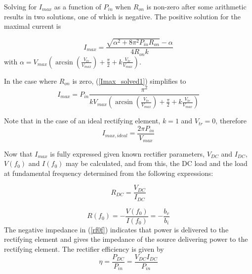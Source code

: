 Solving for $I_{max}$ as a function of $P_{in}$ when $R_{on}$ is non-zero after some arithmetic results in two solutions, one of which is negative. The positive solution for the maximal current is

\begin{equation}\label{Imax_solved1}
    I_{max} = \frac{ \sqrt{\alpha^2 + 8\pi^2P_{in}R_{on}}-\alpha}{4R_{on}k}
\end{equation}
with $\alpha=V_{max}\left(\arcsin\left(\frac{V_{tr}}{V_{max}}\right)+ \frac{\pi}{2} + k\frac{V_{tr}}{V_{max}}\right)$.

In the case where $R_{on}$ is zero, (\ref{Imax_solved1}) simplifies to
\begin{equation}\label{Imax_solve_zeroron_solved}
    I_{max} = P_{in}\frac{\pi^2}{kV_{max}\left(\arcsin\left(\frac{V_{tr}}{V_{max}}\right)+ \frac{\pi}{2} + k\frac{V_{tr}}{V_{max}}\right)}
\end{equation}

Note that in the case of an ideal rectifying element, $k = 1$ and $V_{tr} = 0$, therefore
\begin{equation}\label{Imax_solve_zeroron_solved_ideal}
    I_{max,ideal} = \frac{2\pi P_{in}}{V_{max}}
\end{equation}

Now that $I_{max}$ is fully expressed given known rectifier parameters, $V_{DC}$ and $I_{DC}$, $V(f_0)$ and $I(f_0)$ may be calculated, and from this, the DC load and the load at fundamental frequency determined from the following expressions:

\begin{equation}\label{rdcf}
    R_{DC} = \frac{V_{DC}}{I_{DC}}
\end{equation}

\begin{equation}\label{rf0f}
    R(f_0) = -\frac{V(f_0)}{I(f_0)} = -\frac{b_v}{b_i}
\end{equation}
The negative impedance in (\ref{rf0f}) indicates that power is delivered to the rectifying element and gives the impedance of the source delivering power to the rectifying element.  The rectifier efficiency is given by
\begin{equation}\label{efff}
    \eta = \frac{P_{DC}}{P_{in}} = \frac{V_{DC}I_{DC}}{P_{in}}
\end{equation}










